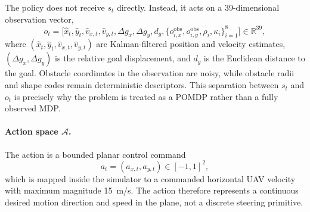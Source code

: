 \documentclass[runningheads]{llncs}
\begin{document}
The policy does not receive $s_t$ directly. Instead, it acts on a 39-dimensional observation vector,
\begin{equation}
  o_t = \bigl[\hat{x}_t,\hat{y}_t,\hat{v}_{x,t},\hat{v}_{y,t},\Delta g_x,\Delta g_y,d_g,\{o^{\mathrm{obs}}_{i,x},o^{\mathrm{obs}}_{i,y},\rho_i,\kappa_i\}_{i=1}^{8}\bigr] \in \mathbb{R}^{39},
\end{equation}
where $(\hat{x}_t,\hat{y}_t,\hat{v}_{x,t},\hat{v}_{y,t})$ are Kalman-filtered position and velocity estimates, $(\Delta g_x,\Delta g_y)$ is the relative goal displacement, and $d_g$ is the Euclidean distance to the goal. Obstacle coordinates in the observation are noisy, while obstacle radii and shape codes remain deterministic descriptors. This separation between $s_t$ and $o_t$ is precisely why the problem is treated as a POMDP rather than a fully observed MDP.

\paragraph{Action space $\mathcal{A}$.}
The action is a bounded planar control command
\begin{equation}
  a_t = (a_{x,t}, a_{y,t}) \in [-1,1]^2,
\end{equation}
which is mapped inside the simulator to a commanded horizontal UAV velocity with maximum magnitude \SI{15}{m/s}. The action therefore represents a continuous desired motion direction and speed in the plane, not a discrete steering primitive.
\end{document}
